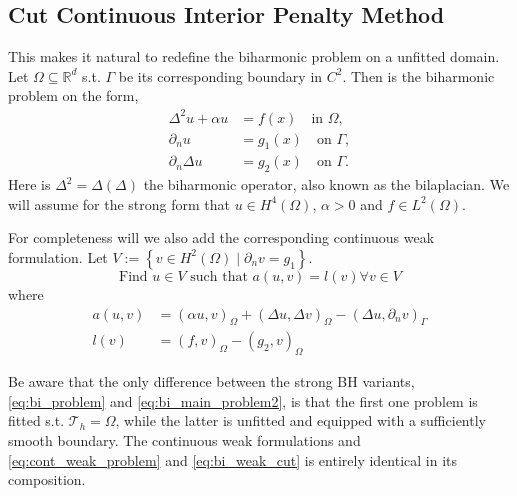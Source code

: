 \subsection{ Cut Continuous Interior Penalty Method }%
\label{sub:cut_cip_method}
This makes it natural to redefine the biharmonic problem on a unfitted domain.
Let $\Omega \subseteq    \mathbb{R} ^d$ s.t. $\Gamma  $ be its corresponding boundary in $C^2$. Then is the biharmonic problem on the form,
\begin{subequations}
\label{eq:bi_main_problem2}
\begin{align}
    \Delta^2  u  + \alpha  u  & = f( x)  \quad \text{in } \Omega,   \label{eq:bi_main_problem2_a}\\
    \partial _{n} u & = g_{1}(x)   \quad \text{on } \Gamma ,  \label{eq:bi_main_problem2_b}\\
    \partial _{n} \Delta  u & = g_{2}( x)   \quad \text{on } \Gamma .  \label{eq:bi_main_problem2_c}
\end{align}
\end{subequations}
Here is $\Delta ^2 = \Delta  \left( \Delta  \right) $ the biharmonic operator, also known as the bilaplacian. We will assume for the strong form that $u \in H^{4}\left( \Omega  \right) $, $\alpha  >0 $ and $f \in L^{2}\left( \Omega  \right)
$.

For completeness will we also add the corresponding continuous weak formulation.
Let $ V := \left\{ v \in H^2( \Omega )  \mid \partial _{n} v = g_{1} \right\}  $.
\begin{equation}
\label{eq:bi_weak_cut}
\text{Find } u \in V   \text{ such that } a( u,v) = l( v)  \forall v \in V
\end{equation}
where
\begin{equation}
    \begin{split}
a( u,v) & =  ( \alpha u,v)_{\Omega } + ( \Delta u, \Delta v)_{\Omega } - (  \Delta u, \partial _{n} v) _{\Gamma }\\
l( v)  &= ( f,v)_{\Omega } - ( g_{2} , v)_\Omega
    \end{split}
\end{equation}

\begin{remark}
    Be aware that the only difference between the strong BH variants, \eqref{eq:bi_problem} and \eqref{eq:bi_main_problem2}, is that the first one problem is fitted s.t. $\mathcal{T}_{h} = \Omega  $, while the latter is unfitted and equipped with a
    sufficiently smooth boundary. The continuous weak formulations and \eqref{eq:cont_weak_problem} and \eqref{eq:bi_weak_cut} is entirely identical in its composition.
\end{remark}


